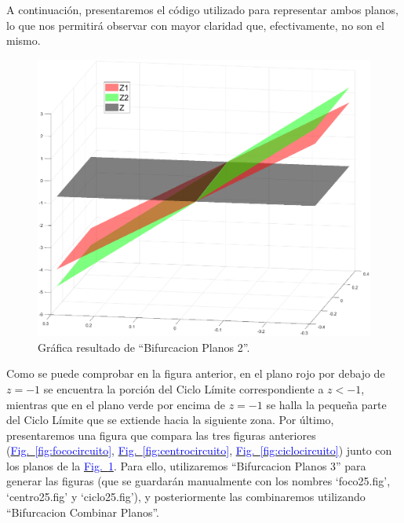 \documentclass[12pt,a4paper]{report} %
\newcommand{\fref}[1]{\hyperref[#1]{\textcolor{blue}{Fig.~\ref*{#1}}}}
\newcommand{\fref}[1]{\hyperref[#1]{\textcolor{blue}{\textit{Fig.~\ref*{#1}}}}}
\begin{document}
	\vspace{0.5cm}A continuación, presentaremos el código utilizado para representar ambos planos, lo que nos permitirá observar con mayor claridad que, efectivamente, no son el mismo.
	
	\vspace{0.5cm}
	
	\newpage
	
	\begin{figure}[h]
		\centering
		\includegraphics[width=1\textwidth]{planoscircuito.eps}
		\caption{Gráfica resultado de ``Bifurcacion Planos 2''.}
		\label{fig:planoscircuito}
	\end{figure}\smallskip
	
	\vspace{0.5cm}\noindent Como se puede comprobar en la figura anterior, en el plano rojo por debajo de $z=-1$ se encuentra la porción del Ciclo Límite correspondiente a $z<-1$, mientras que en el plano verde por encima de $z=-1$ se halla la pequeña parte del Ciclo Límite que se extiende hacia la siguiente zona. Por último, presentaremos una figura que compara las tres figuras anteriores (\fref{fig:fococircuito}, \fref{fig:centrocircuito}, \fref{fig:ciclocircuito}) junto con los planos de la \fref{fig:planoscircuito}. Para ello, utilizaremos ``Bifurcacion Planos 3'' para generar las figuras (que se guardarán manualmente con los nombres `foco25.fig', `centro25.fig' y `ciclo25.fig'), y posteriormente las combinaremos utilizando ``Bifurcacion Combinar Planos''.
	\newpage
	
\end{document}
